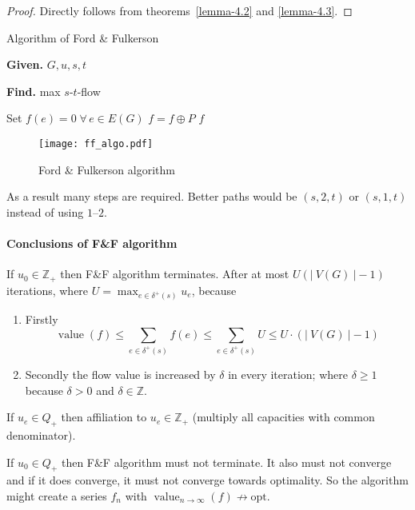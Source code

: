 \documentclass{article}
\newcommand{\card}[1]{\left|\:\!#1\:\!\right|}
\newcommand{\given}[1]{\textbf{Given.} #1\par}
\newcommand{\find}[1]{\textbf{Find.} #1\par}
\newcommand{\gath}[2]{$#1$-$#2$-path} %
\newcommand{\flow}[2]{$#1$-$#2$-flow}
\newcommand{\fall}{\;\forall\,}
\begin{document}
\begin{proof}
  Directly follows from theorems~\ref{lemma-4.2} and \ref{lemma-4.3}.
\end{proof}

\begin{algorithm}
  \caption{Algorithm of Ford \& Fulkerson}
  \label{min-cut-algo}
  \given{$G, u, s, t$}
  \find{max \flow st}
\begin{algorithmic}[1]
  \State Set $f(e) = 0 \fall e \in E(G)$
  \While{$\exists$ \gath st $P$ in $G_f$}
    \State $f = f \oplus P$
  \EndWhile
  \State \Return $f$
\end{algorithmic}
\end{algorithm}

\begin{figure}[!h]
 \begin{center}
  \texttt{[image: ff\_algo.pdf]}
  \caption{Ford \& Fulkerson algorithm}
 \end{center}
\end{figure}

As a result many steps are required. Better paths would be $(s, 2, t)$ or $(s, 1, t)$ instead of using $1$--$2$.

\paragraph{Conclusions of F\&F algorithm}
If $u_0 \in \mathbb{Z}_+$ then F\&F algorithm terminates.
After at most $U(\card{V(G)} - 1)$ iterations, where $U = \max_{e \in \delta^+(s)} u_e$, because
\begin{enumerate}
  \item Firstly
    \[
      \operatorname{value}(f)
        \leq \sum_{e \in \delta^+(s)} f(e)
        \leq \sum_{e \in \delta^+(s)} U
        \leq U \cdot (\card{V(G)} - 1)
    \]
  \item Secondly the flow value is increased by $\delta$ in every iteration; where $\delta \geq 1$ because $\delta > 0$ and $\delta \in \mathbb{Z}$.
\end{enumerate}

If $u_e \in Q_+$ then affiliation to $u_e \in \mathbb{Z}_+$ (multiply all capacities with common denominator).

If $u_0 \in Q_+$ then F\&F algorithm must not terminate. It also must not converge and if it does converge, it must not converge towards optimality. So the algorithm might create a series $f_n$ with $\operatorname{value}_{n\rightarrow\infty}(f) \nrightarrow \text{opt}$.
\end{document}
